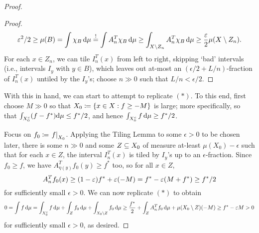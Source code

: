 \documentclass[reqno, twoside]{article}
\begin{document}
\begin{proof}
\begin{center}
\begin{minipage}{0.95\textwidth}
\begin{proof}
                    \vspace{-0.05in}
                    \begin{equation*}
                        \epsilon^2/2\geq\mu(B)=\int\chi_B\,\d\mu\overset{!}{=}\int A_n^T\chi_B\,\d\mu\geq\int_{X\comp Z_n}A_n^T\chi_B\,\d\mu\geq\frac{\epsilon}{2}\mu(X\comp Z_n).
                        \vspace{-0.05in}
                    \end{equation*}
                    For each $x\in Z_n$, we can tile $I_n^T(x)$ from left to right, skipping `bad' intervals (i.e., intervals $I_y$ with $y\in B$), which leaves out at-most an $(\epsilon/2+L/n)$-fraction of $I_n^T(x)$ untiled by the $I_y$'s; choose $n\gg0$ such that $L/n<\epsilon/2$.\qedlem
                \end{proof}
            \end{minipage}
        \end{center}
        With this in hand, we can start to attempt to replicate $(\ast)$. To this end, first choose $M\gg0$ so that $X_0\coloneqq\left\{x\in X: f\geq-M\right\}$ is large; more specifically, so that $\int_{X_0^c}(f-f^\ast)\mathrm{d}\mu\leq f^\ast/2$, and hence $\int_{X_0^c}f\,\mathrm{d}\mu\geq f^\ast/2$.

        Focus on $f_0\coloneqq\left.f\right|_{X_0}$. Applying the Tiling Lemma to some $\epsilon>0$ to be chosen later, there is some $n\gg0$ and some $Z\subseteq X_0$ of measure at-least $\mu(X_0)-\epsilon$ such that for each $x\in Z$, the interval $I_n^T(x)$ is tiled by $I_y$'s up to an $\epsilon$-fraction. Since $f_0\geq f$, we have $A^T_{\eta(y)}f_0(y)\geq f^\ast$ too, so for all $x\in Z$,
        \vspace{-0.05in}
        \begin{equation*}
            A_n^Tf_0(x)\geq(1-\epsilon)f^\ast+\epsilon(-M)=f^\ast-\epsilon(M+f^\ast)\geq f^\ast/2
            \vspace{-0.05in}
        \end{equation*}
        for sufficiently small $\epsilon>0$. We can now replicate $(\ast)$ to obtain
        \vspace{-0.05in}
        \begin{equation*}
            0=\int f\,\d\mu=\int_{X_0^c}f\,\d\mu+\int_Zf_0\,\d\mu+\int_{X_0\comp Z}f_0\,\d\mu\geq\frac{f^\ast}{2}+\int_ZA_n^Tf_0\,\d\mu+\mu(X_0\comp Z)(-M)\geq f^\ast-\epsilon M>0
            \vspace{-0.05in}
        \end{equation*}
        for sufficiently small $\epsilon>0$, as desired.
    \end{proof}
\end{document}
